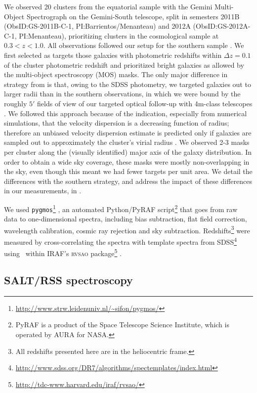 We observed 20 clusters from the equatorial sample with the Gemini Multi-Object Spectrograph 
\citep[GMOS,][]{hook04} on the Gemini-South telescope, split in semesters 2011B 
(ObsID:GS-2011B-C-1, PI:Barrientos/Menanteau) and 2012A (ObsID:GS-2012A-C-1, PI:Menanteau), 
prioritizing clusters in the cosmological sample at $0.3<z<1.0$. All observations followed our 
setup for the southern sample \citep{sifon13}. We first selected as targets those galaxies with 
photometric redshifts within $\Delta z=0.1$ of the cluster photometric redshift and prioritized 
bright galaxies as allowed by the multi-object spectroscopy (MOS) masks. The only major difference 
in strategy from \cite{sifon13} is that, owing to the SDSS photometry, we targeted galaxies out to 
larger radii than in the southern observations, in which we were bound by the roughly $5'$ 
fields of view of our targeted optical follow-up with 4m-class telescopes \citep{menanteau10_act}. We 
followed this approach because of the indication, especially from numerical simulations, that the 
velocity dispersion is a decreasing function of radius; therefore an unbiased velocity dispersion 
estimate is predicted only if galaxies are sampled out to approximately the cluster's virial 
radius \citep[e.g.,][]{girardi98,biviano06,mamon10}. We observed 2-3 masks per cluster along the 
(visually identified) major axis of the galaxy distribution. In order to obtain a wide sky 
coverage, these masks were mostly non-overlapping in the sky, even though this meant we had fewer 
targets per unit area. We detail the differences with the southern strategy, and address the 
impact of these differences in our measurements, in .

We used \texttt{pygmos}\footnote{\url{http://www.strw.leidenuniv.nl/\~sifon/pygmos/}} 
\citep{sifon13}, an automated Python/PyRAF script\footnote{PyRAF is a product of the Space 
Telescope Science Institute, which is operated by AURA for NASA.} that goes from raw data to 
one-dimensional spectra, including bias subtraction, flat field correction, wavelength 
calibration, cosmic ray rejection \citep{vandokkum01} and sky subtraction. Redshifts\footnote{All 
redshifts presented here are in the heliocentric frame.} were measured by cross-correlating the 
spectra with template spectra from 
SDSS\footnote{\url{http://www.sdss.org/DR7/algorithms/spectemplates/index.html}} using \xcsao\ 
within IRAF's \textsc{rvsao} package\footnote{\url{http://tdc-www.harvard.edu/iraf/rvsao/}} 
\citep{kurtz98}.

\subsection{SALT/RSS spectroscopy}\label{s:salt}


